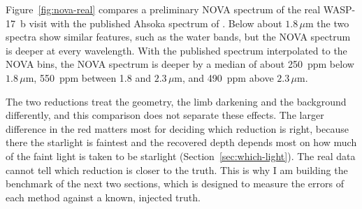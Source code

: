 Figure~\ref{fig:nova-real} compares a preliminary NOVA spectrum of the real
WASP-17~b visit with the published
Ahsoka spectrum of \citet{LouieEtAl2025}. Below about $1.8\,\mu\mathrm{m}$ the
two spectra show similar features, such as the water bands, but the NOVA
spectrum is deeper at every wavelength. With the published spectrum interpolated
to the NOVA bins, the NOVA spectrum is deeper by a median of about 250~ppm below $1.8\,\mu\mathrm{m}$, 550~ppm between 1.8 and $2.3\,\mu\mathrm{m}$, and
490~ppm above $2.3\,\mu\mathrm{m}$.

The two reductions treat the geometry, the limb darkening and the background
differently, and this comparison does not separate these effects. The larger difference in the red matters most for deciding which reduction is right, because there the starlight is faintest and the recovered depth depends most on how much of the faint light is taken to be starlight (Section~\ref{sec:which-light}). The real data cannot tell which
reduction is closer to the truth. This is why I am building the benchmark of the
next two sections, which is designed to measure the errors of each method
against a known, injected truth.
